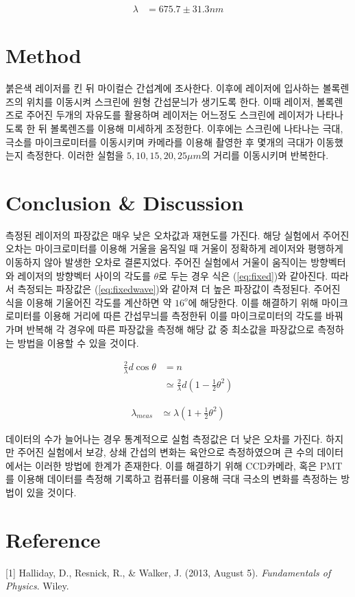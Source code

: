 \documentclass[%
 reprint,
 amsmath,amssymb,
 aps,
]{revtex4-2}
\begin{document}
\begin{align}
	\lambda &= 675.7 \pm 31.3 nm \label{eq:wave}
\end{align}

\section{\label{sec:level1}Method}
붉은색 레이저를 킨 뒤 마이컬슨 간섭계에 조사한다. 이후에 레이저에 입사하는 볼록렌즈의 위치를 이동시켜 스크린에 원형 간섭문늬가 생기도록 한다. 이때 레이저, 볼록렌즈로 주어진 두개의 자유도를 활용하며 레이저는 어느정도 스크린에 레이저가 나타나도록 한 뒤 볼록렌즈를 이용해 미세하게 조정한다. 이후에는 스크린에 나타나는 극대, 극소를 마이크로미터를 이동시키며 카메라를 이용해 촬영한 후 몇개의 극대가 이동했는지 측정한다. 이러한 실험을 $5, 10, 15, 20, 25\mu m$의 거리를 이동시키며 반복한다.

\section{\label{sec:level1}Conclusion \& Discussion}
측정된 레이저의 파장값은 매우 낮은 오차값과 재현도를 가진다. 해당 실험에서 주어진 오차는 마이크로미터를 이용해 거울을 움직일 때 거울이 정확하게 레이저와 평행하게 이동하지 않아 발생한 오차로 결론지었다. 주어진 실험에서 거울이 움직이는 방향벡터와 레이저의 방향벡터 사이의 각도를 $\theta$로 두는 경우 식은 (\ref{eq:fixed})와 같아진다. 따라서 측정되는 파장값은 (\ref{eq:fixedwave})와 같아져 더 높은 파장값이 측정된다. 주어진 식을 이용해 기울어진 각도를 계산하면 약 $16^{o}$에 해당한다. 이를 해결하기 위해 마이크로미터를 이용해 거리에 따른 간섭무늬를 측정한뒤 이를 마이크로미터의 각도를 바꿔가며 반복해 각 경우에 따른 파장값을 측정해 해당 값 중 최소값을 파장값으로 측정하는 방법을 이용할 수 있을 것이다.

\begin{align}
	\frac{2}{\lambda}d\cos\theta &= n\\
	&\simeq \frac{2}{\lambda}d\left(1-\frac{1}{2}\theta^{2}\right)\label{eq:fixed}
\end{align}

\begin{align}
	\lambda_{meas} &\simeq \lambda \left(1+\frac{1}{2}\theta^{2}\right)\label{eq:fixedwave}
\end{align}

데이터의 수가 늘어나는 경우 통계적으로 실험 측정값은 더 낮은 오차를 가진다. 하지만 주어진 실험에서 보강, 상쇄 간섭의 변화는 육안으로 측정하였으며 큰 수의 데이터에서는 이러한 방법에 한계가 존재한다. 이를 해결하기 위해 CCD카메라, 혹은 PMT를 이용해 데이터를 측정해 기록하고 컴퓨터를 이용해 극대 극소의 변화를 측정하는 방법이 있을 것이다.

\section{\label{sec:level1}Reference}

[1] Halliday, D., Resnick, R., \& Walker, J. (2013, August 5). \textit{Fundamentals of Physics}. Wiley.
\end{document}

